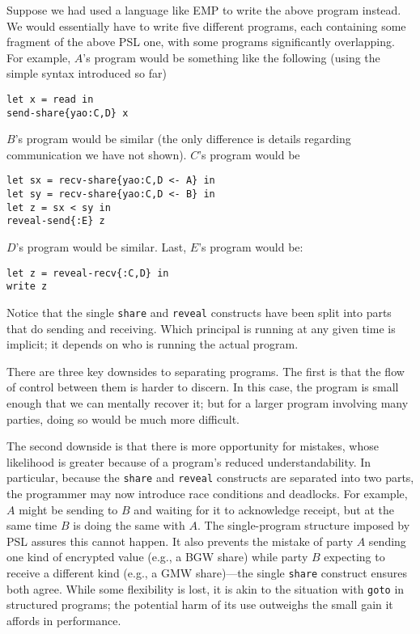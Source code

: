 \documentclass[10pt]{article}
\begin{document}
Suppose we had used a language like EMP to write the above program
instead. We would essentially have to write five different programs,
each containing some fragment of the above PSL one, with some
programs significantly overlapping. For example, $A$'s program would
be something like the following (using the simple syntax introduced
so far)
\begin{verbatim}
let x = read in 
send-share{yao:C,D} x
\end{verbatim}
$B$'s program would be similar (the only difference is details
regarding communication we have not shown). $C$'s program would be
\begin{verbatim}
let sx = recv-share{yao:C,D <- A} in
let sy = recv-share{yao:C,D <- B} in
let z = sx < sy in 
reveal-send{:E} z
\end{verbatim}
$D$'s program would be similar. Last, $E$'s program would be:
\begin{verbatim}
let z = reveal-recv{:C,D} in
write z
\end{verbatim}
Notice that the single \texttt{share} and \texttt{reveal} constructs
have been split into parts that do sending and receiving. Which
principal is running at any given time is implicit; it depends on who
is running the actual program.

There are three key downsides to separating programs. The first is
that the flow of control between them is harder to discern. In this
case, the program is small enough that we can mentally recover it; but
for a larger program involving many parties, doing so would be much
more difficult. 

The second downside is that there is more opportunity for mistakes,
whose likelihood is greater because of a program's reduced
understandability. In particular, because the \texttt{share} and
\texttt{reveal} constructs are separated into two parts, the
programmer may now introduce race conditions and deadlocks. For
example, $A$ might be sending to $B$ and waiting for it to acknowledge
receipt, but at the same time $B$ is doing the same with $A$. The
single-program structure imposed by PSL assures this cannot happen. It
also prevents the mistake of party $A$ sending one kind of encrypted
value (e.g., a BGW share) while party $B$ expecting to receive a
different kind (e.g., a GMW share)---the single \texttt{share}
construct ensures both agree. While some flexibility is lost, it is
akin to the situation with \texttt{goto} in structured programs; the
potential harm of its use outweighs the small gain it affords in
performance.
\end{document}
